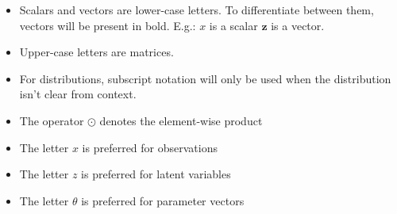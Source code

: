 \begin{itemize}
    \item Scalars and vectors are lower-case letters. To differentiate between
them, vectors will be present in bold. E.g.: $x$ is a scalar $\mathbf{z}$ is
a vector.
    \item Upper-case letters are matrices.
    \item For distributions, subscript notation will only be used when the
distribution isn't clear from context.
    \item The operator $\odot$ denotes the element-wise product
    \item The letter $x$ is preferred for observations
    \item The letter $z$ is preferred for latent variables
    \item The letter $\theta$ is preferred for parameter vectors
\end{itemize}
